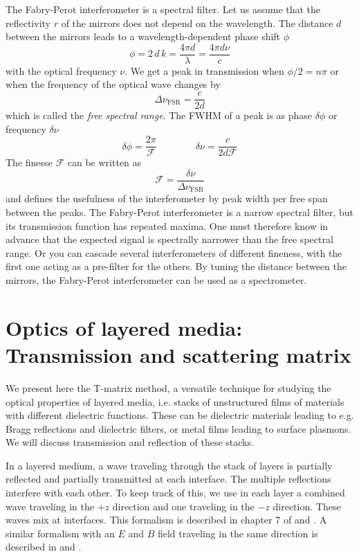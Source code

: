 The Fabry-Perot interferometer is a spectral filter. Let us assume that the reflectivity $r$ of the mirrors does not depend on the wavelength. The distance $d$ between the mirrors leads to a wavelength-dependent phase shift $\phi$
\begin{equation}
  \phi = 2 \, d \, k = \frac{4 \pi d}{\lambda} =  \frac{4 \pi d  \nu}{c}
\end{equation}
with the optical frequency $\nu$. We get a peak in transmission when $\phi/2  = n \pi$ or when the frequency of the optical wave changes by 
\begin{equation}
  \Delta \nu_\text{FSR} = \frac{c}{2d}
\end{equation}
which is called the \emph{free spectral range}. The FWHM of a peak is as phase $ \delta \phi $ or frequency $ \delta \nu$ 
\begin{equation}
  \delta \phi = \frac{2 \pi }{\mathcal{F}} \qquad\qquad \delta \nu = \frac{c}{2 d \mathcal{F}}
\end{equation}
The finesse $\mathcal{F}$ can be written as
\begin{equation}
  \mathcal{F} = \frac{ \delta \nu}{ \Delta \nu_\text{FSR}}
\end{equation}
and defines the usefulness of the interferometer by peak width per free span between the peaks. The Fabry-Perot interferometer is a narrow spectral filter, but its transmission function has repeated maxima. One must therefore know in advance that the expected signal is spectrally narrower than the free spectral range. Or you can cascade several interferometers of different fineness, with the first one acting as a pre-filter for the others. By tuning the distance between the mirrors, the Fabry-Perot interferometer can be used as a spectrometer.


\section{Optics of layered media: Transmission and scattering matrix}
We present here the T-matrix method, a versatile technique for studying the optical properties of layered media, i.e. stacks of unstructured films of materials with different dielectric functions. These can be dielectric materials leading to e.g. Bragg reflections and dielectric filters, or metal films leading to surface plasmons. We will discuss transmission and reflection of these stacks.

In a layered medium, a wave traveling through the stack of layers is partially reflected and partially transmitted at each interface. The multiple reflections interfere with each other. To keep track of this, we use in each layer a combined wave traveling in the $+z$ direction and one traveling in the $-z$ direction. These waves mix at interfaces. This formalism is described in chapter 7 of \cite{SalehTeich1991} and \cite{Yeh2005}. A similar formalism with an $E$ and $B$ field traveling in the same direction is described in \cite{Pedrotti2008} and \cite{Macleod2001}.

